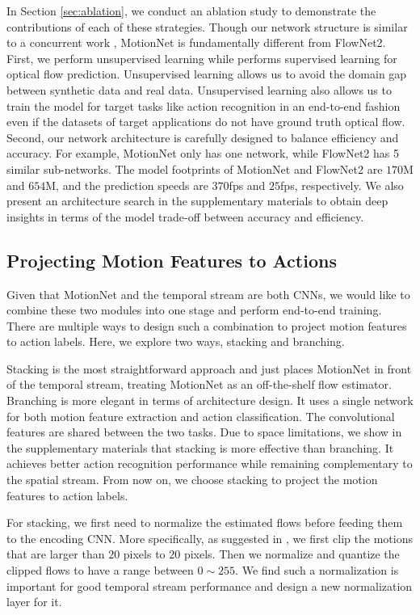 \documentclass[runningheads]{llncs}
\begin{document}
		In Section \ref{sec:ablation}, we conduct an ablation study to demonstrate the contributions of each of these strategies. Though our network structure is similar to a concurrent work \cite{flownet2}, MotionNet is fundamentally different from FlowNet2. First, we perform unsupervised learning while \cite{flownet2} performs supervised learning for optical flow prediction. Unsupervised learning allows us to avoid the domain gap between synthetic data and real data. Unsupervised learning also allows us to train the model for target tasks like action recognition in an end-to-end fashion even if the datasets of target applications do not have ground truth optical flow. 
		Second, our network architecture is carefully designed to balance efficiency and accuracy. For example, MotionNet only has one network, while FlowNet2 has 5 similar sub-networks. The model footprints of MotionNet and FlowNet2 \cite{flownet2} are $170$M and $654$M, and the prediction speeds are $370$fps and $25$fps, respectively. We also present an architecture search in the supplementary materials to obtain deep insights in terms of the model trade-off between accuracy and efficiency. 


		\subsection{Projecting Motion Features to Actions}
		\label{sec:stacked}
		Given that MotionNet and the temporal stream are both CNNs, we would like to combine these two modules into one stage and perform end-to-end training. There are multiple ways to design such a combination to project motion features to action labels. Here, we explore two ways, stacking and branching. 
		
		Stacking is the most straightforward approach and just places MotionNet in front of the temporal stream, treating MotionNet as an off-the-shelf flow estimator. Branching is more elegant in terms of architecture design. It uses a single network for both motion feature extraction and action classification. The convolutional features are shared between the two tasks. Due to space limitations, we show in the supplementary materials that stacking is more effective than branching. It achieves better action recognition performance while remaining complementary to the spatial stream. From now on, we choose stacking to project the motion features to action labels.
		
		For stacking, we first need to normalize the estimated flows before feeding them to the encoding CNN. More specifically, as suggested in \cite{twostream2014}, we first clip the motions that are larger than $20$ pixels to $20$ pixels. Then we normalize and quantize the clipped flows to have a range between $0 \sim 255$. We find such a normalization is important for good temporal stream performance and design a new normalization layer for it. 
		
\end{document}
